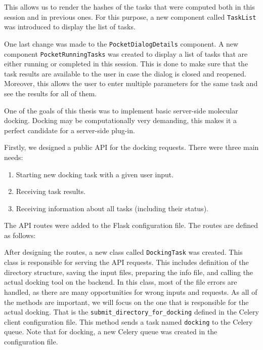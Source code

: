 This allows us to render the hashes of the tasks that were computed both in this session and in previous ones. For this purpose, a new component called \texttt{TaskList} was introduced to display the list of tasks. 

One last change was made to the \texttt{PocketDialogDetails} component. A new component \texttt{PocketRunningTasks} was created to display a list of tasks that are either running or completed in this session. This is done to make sure that the task results are available to the user in case the dialog is closed and reopened. Moreover, this allows the user to enter multiple parameters for the same task and see the results for all of them.

One of the goals of this thesis was to implement basic server-side molecular docking. Docking may be computationally very demanding, this makes it a perfect candidate for a server-side plug-in.

Firstly, we designed a public API for the docking requests. There were three main needs:
\begin{enumerate}
    \item Starting new docking task with a given user input.
    \item Receiving task results.
    \item Receiving information about all tasks (including their status).
\end{enumerate}
The API routes were added to the Flask configuration file. The routes are defined as follows:



After designing the routes, a new class called \texttt{DockingTask} was created. This class is responsible for serving the API requests. This includes definition of the directory structure, saving the input files, preparing the info file, and calling the actual docking tool on the backend. In this class, most of the file errors are handled, as there are many opportunities for wrong inputs and requests. As all of the methods are important, we will focus on the one that is responsible for the actual docking. That is the \texttt{submit\_directory\_for\_docking} defined in the Celery client configuration file. This method sends a task named \texttt{docking} to the Celery queue. Note that for docking, a new Celery queue was created in the configuration file.

